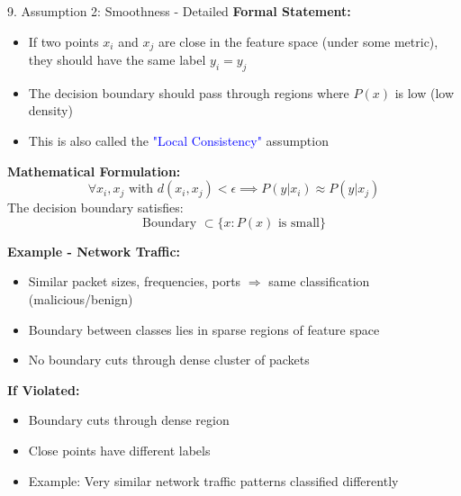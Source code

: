 \documentclass[8pt]{beamer}
\begin{document}
	\begin{frame}{9. Assumption 2: Smoothness - Detailed}
		\fontsize{6.5}{7.5}\selectfont
		\textbf{Formal Statement:}
		\begin{itemize}
			\item If two points $x_i$ and $x_j$ are close in the feature space (under some metric), they should have the same label $y_i = y_j$
			\item The decision boundary should pass through regions where $P(x)$ is low (low density)
			\item This is also called the \textcolor{blue}{"Local Consistency"} assumption
		\end{itemize}
		
		\textbf{Mathematical Formulation:}
		\[
		\forall x_i, x_j \text{ with } d(x_i, x_j) < \epsilon \implies P(y|x_i) \approx P(y|x_j)
		\]
		The decision boundary satisfies:
		\[
		\text{Boundary } \subset \{x : P(x) \text{ is small}\}
		\]
		
		\textbf{Example - Network Traffic:}
		\begin{itemize}
			\item Similar packet sizes, frequencies, ports $\Rightarrow$ same classification (malicious/benign)
			\item Boundary between classes lies in sparse regions of feature space
			\item No boundary cuts through dense cluster of packets
		\end{itemize}
		
		\textbf{If Violated:}
		\begin{itemize}
			\item Boundary cuts through dense region
			\item Close points have different labels
			\item Example: Very similar network traffic patterns classified differently
		\end{itemize}
	\end{frame}
	
\end{document}
